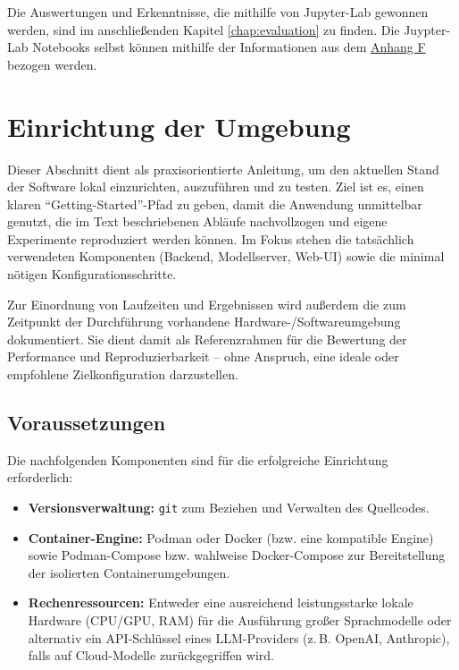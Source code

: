     Die Auswertungen und Erkenntnisse, die mithilfe von Jupyter-Lab gewonnen werden, sind im anschließenden Kapitel \ref{chap:evaluation} zu finden.
    Die Juypter-Lab Notebooks selbst können mithilfe der Informationen aus dem \hyperref[sec:full_code]{Anhang F} bezogen werden.

  \section{Einrichtung der Umgebung}

    Dieser Abschnitt dient als praxisorientierte Anleitung, um den aktuellen Stand der Software lokal einzurichten, auszuführen und zu testen.
    Ziel ist es, einen klaren \enquote{Getting-Started}-Pfad zu geben, damit die Anwendung unmittelbar genutzt, die im Text beschriebenen Abläufe nachvollzogen und eigene Experimente reproduziert werden können.
    Im Fokus stehen die tatsächlich verwendeten Komponenten (Backend, Modellserver, Web-UI) sowie die minimal nötigen Konfigurationsschritte.

    Zur Einordnung von Laufzeiten und Ergebnissen wird außerdem die zum Zeitpunkt der Durchführung vorhandene Hardware-/Softwareumgebung dokumentiert.
    Sie dient damit als Referenzrahmen für die Bewertung der Performance und Reproduzierbarkeit -- ohne Anspruch, eine ideale oder empfohlene Zielkonfiguration darzustellen.


    \subsection{Voraussetzungen}

      Die nachfolgenden Komponenten sind für die erfolgreiche Einrichtung erforderlich:

      \begin{itemize}
        \item \textbf{Versionsverwaltung:} \texttt{git} zum Beziehen und Verwalten des Quellcodes.
        \item \textbf{Container-Engine:} Podman oder Docker (bzw. eine kompatible Engine) sowie Podman-Compose bzw. wahlweise Docker-Compose zur Bereitstellung der isolierten Containerumgebungen.
        \item \textbf{Rechenressourcen:} Entweder eine ausreichend leistungsstarke lokale Hardware (CPU/\acs{GPU}, RAM) für die Ausführung großer Sprachmodelle oder alternativ ein API-Schlüssel eines LLM-Providers (z.\,B. OpenAI, Anthropic), falls auf Cloud-Modelle zurückgegriffen wird.
      \end{itemize}


